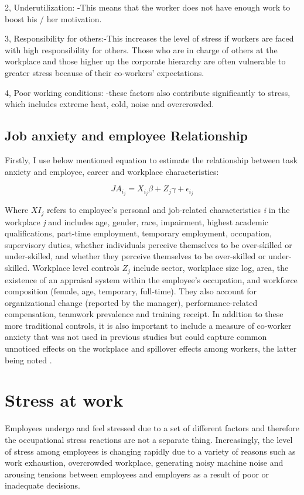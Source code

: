 2, Underutilization: -This means that the worker does not have enough work to boost his / her motivation.

3, Responsibility for others:-This increases the level of stress if workers are faced with high responsibility for others.  Those who are in charge of others at the workplace and those higher up the corporate hierarchy are often vulnerable to greater stress because of their co-workers' expectations.

4, Poor working conditions: -these factors also contribute significantly to stress, which includes extreme heat, cold, noise and overcrowded. \citep[p.318-319]{Bloisi2007ManagementBehaviour}

\subsection{Job anxiety and employee Relationship}

Firstly, I use below mentioned equation to estimate the relationship between task anxiety and employee, career and workplace characteristics:\citep{Cottini2013MentalEurope}

\[JA_{i_j} = X_{i_j} \beta+Z_j \gamma+\epsilon_{i_j}\] 

Where \(X { I_j}\) refers to employee's personal and job-related characteristics \textit{i } in the workplace \textit{j } and includes age, gender, race, impairment, highest academic qualifications, part-time employment, temporary employment, occupation, supervisory duties, whether individuals perceive themselves to be over-skilled or under-skilled, and whether they perceive themselves to be over-skilled or under-skilled. Workplace level controls \(Z_j\) include sector, workplace size log, area, the existence of an appraisal system within the employee's occupation, and workforce composition (female, age, temporary, full-time). They also account for organizational change (reported by the manager), performance-related compensation, teamwork prevalence and training receipt.  In addition to these more traditional controls, it is also important to include a measure of co-worker anxiety that was not used in previous studies but could capture common unnoticed effects on the workplace and spillover effects among workers, the latter being noted \citep{Cottini2013MentalEurope}.

\section{Stress at work}
Employees undergo and feel stressed due to a set of different factors and therefore the occupational stress reactions are not a separate thing. \citep[p.8]{Fairbrother2003WorkplaceSatisfaction} Increasingly, the level of stress among employees is changing rapidly due to a variety of reasons such as work exhaustion, overcrowded workplace, generating noisy machine noise and arousing tensions between employees and employers as a result of poor or inadequate decisions.

